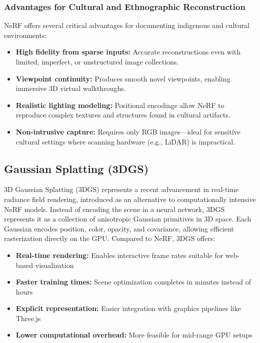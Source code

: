 \subsubsection*{Advantages for Cultural and Ethnographic Reconstruction}

NeRF offers several critical advantages for documenting indigenous and cultural environments:

\begin{itemize}
    \item \textbf{High fidelity from sparse inputs:} Accurate reconstructions even with limited, imperfect, or unstructured image collections.
    \item \textbf{Viewpoint continuity:} Produces smooth novel viewpoints, enabling immersive 3D virtual walkthroughs.
    \item \textbf{Realistic lighting modeling:} Positional encodings allow NeRF to reproduce complex textures and structures found in cultural artifacts.
    \item \textbf{Non-intrusive capture:} Requires only RGB images—ideal for sensitive cultural settings where scanning hardware (e.g., LiDAR) is impractical.
\end{itemize}



\subsection{Gaussian Splatting (3DGS)}
3D Gaussian Splatting (3DGS) represents a recent advancement in real-time radiance field rendering, introduced as an alternative to computationally intensive NeRF models. Instead of encoding the scene in a neural network, 3DGS represents it as a collection of anisotropic Gaussian primitives in 3D space. Each Gaussian encodes position, color, opacity, and covariance, allowing efficient rasterization directly on the GPU.
Compared to NeRF, 3DGS offers:

\begin{itemize}
    \item \textbf{Real-time rendering:} Enables interactive frame rates suitable for web-based visualization
    \item \textbf{Faster training times:} Scene optimization completes in minutes instead of hours
    \item \textbf{Explicit representation:} Easier integration with graphics pipelines like Three.js
    \item \textbf{Lower computational overhead:} More feasible for mid-range GPU setups
\end{itemize}





